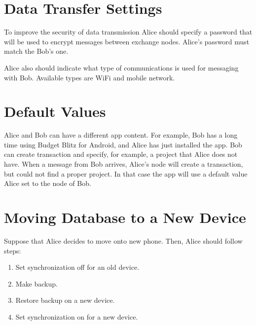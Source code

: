 \documentclass[a4paper,10pt,english]{sphinxmanual}
\begin{document}
\section{Data Transfer Settings}
\label{\detokenize{teamwork:data-transfer-settings}}
\sphinxAtStartPar
To improve the security of data transmission Alice should specify a password that will
be used to encrypt messages between exchange nodes. Alice’s password must match the Bob’s one.

\sphinxAtStartPar
Alice also should indicate what type of communications is used for messaging with Bob.
Available types are Wi\sphinxhyphen{}Fi and mobile network.


\section{Default Values}
\label{\detokenize{teamwork:default-values}}
\sphinxAtStartPar
Alice and Bob can have a different app content. For example, Bob has a long time using Budget Blitz for Android,
and Alice has just installed the app. Bob can create transaction and specify, for example,
a project that Alice does not have. When a message from Bob arrives, Alice’s node will
create a transaction, but could not find a proper project. In that case the app will
use a default value Alice set to the node of Bob.


\section{Moving Database to a New Device}
\label{\detokenize{teamwork:moving-database-to-a-new-device}}
\sphinxAtStartPar
Suppose that Alice decides to move onto new phone. Then, Alice should follow steps:
\begin{enumerate}
%
\item {} 
\sphinxAtStartPar
Set synchronization off for an old device.

\item {} 
\sphinxAtStartPar
Make backup.

\item {} 
\sphinxAtStartPar
Restore backup on a new device.

\item {} 
\sphinxAtStartPar
Set synchronization on for a new device.

\end{enumerate}

\sphinxstepscope
\end{document}
